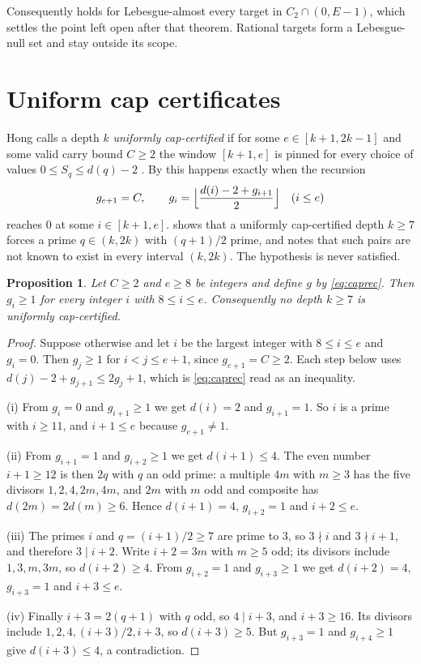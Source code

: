 \documentclass[11pt]{amsart}
\newtheorem{proposition}[theorem]{Proposition}
\begin{document}
Consequently \cite[Theorem~8.5]{hong} holds for Lebesgue-almost every target
in $C_2\cap(0,E-1)$, which settles the point left open after that theorem.
Rational targets form a Lebesgue-null set and stay outside its scope.

\section{Uniform cap certificates}

Hong calls a depth $k$ \emph{uniformly cap-certified} if for some
$e\in[k+1,2k-1]$ and some valid carry bound $C\ge2$ the window $[k+1,e]$ is
pinned for every choice of values $0\le S_q\le d(q)-2$ \cite[\S9.4]{hong}. By
\cite[Lemma~3.4]{hong} this happens exactly when the recursion
\begin{equation}\label{eq:caprec}
 g_{e+1}=C,\qquad g_i=\Bigl\lfloor\frac{d(i)-2+g_{i+1}}{2}\Bigr\rfloor\quad(i\le e)
\end{equation}
reaches $0$ at some $i\in[k+1,e]$. \cite[Proposition~9.4]{hong} shows that a
uniformly cap-certified depth $k\ge7$ forces a prime $q\in(k,2k)$ with
$(q+1)/2$ prime, and notes that such pairs are not known to exist in every
interval $(k,2k)$. The hypothesis is never satisfied.

\begin{proposition}\label{prop:nocert}
Let $C\ge2$ and $e\ge8$ be integers and define $g$ by \eqref{eq:caprec}.
Then $g_i\ge1$ for every integer $i$ with $8\le i\le e$. Consequently no depth
$k\ge7$ is uniformly cap-certified.
\end{proposition}

\begin{proof}
Suppose otherwise and let $i$ be the largest integer with $8\le i\le e$ and
$g_i=0$. Then $g_j\ge1$ for $i<j\le e+1$, since $g_{e+1}=C\ge2$. Each step
below uses $d(j)-2+g_{j+1}\le 2g_j+1$, which is \eqref{eq:caprec} read as an
inequality.

(i) From $g_i=0$ and $g_{i+1}\ge1$ we get $d(i)=2$ and $g_{i+1}=1$. So $i$ is a
prime with $i\ge11$, and $i+1\le e$ because $g_{e+1}\ne1$.

(ii) From $g_{i+1}=1$ and $g_{i+2}\ge1$ we get $d(i+1)\le4$. The even number
$i+1\ge12$ is then $2q$ with $q$ an odd prime: a multiple $4m$ with $m\ge3$ has
the five divisors $1,2,4,2m,4m$, and $2m$ with $m$ odd and composite has
$d(2m)=2d(m)\ge6$. Hence $d(i+1)=4$, $g_{i+2}=1$ and $i+2\le e$.

(iii) The primes $i$ and $q=(i+1)/2\ge7$ are prime to $3$, so $3\nmid i$ and
$3\nmid i+1$, and therefore $3\mid i+2$. Write $i+2=3m$ with $m\ge5$ odd; its
divisors include $1,3,m,3m$, so $d(i+2)\ge4$. From $g_{i+2}=1$ and
$g_{i+3}\ge1$ we get $d(i+2)=4$, $g_{i+3}=1$ and $i+3\le e$.

(iv) Finally $i+3=2(q+1)$ with $q$ odd, so $4\mid i+3$, and $i+3\ge16$. Its
divisors include $1,2,4,(i+3)/2,i+3$, so $d(i+3)\ge5$. But $g_{i+3}=1$ and
$g_{i+4}\ge1$ give $d(i+3)\le4$, a contradiction.
\end{proof}
\end{document}
